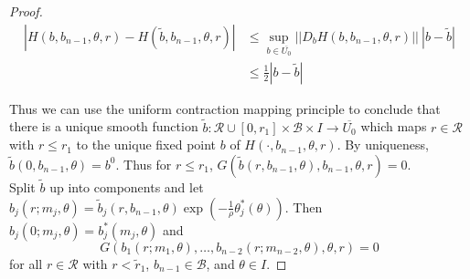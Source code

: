 \documentclass[thesis.tex]{subfiles}
\begin{document}
\begin{theorem}
\begin{proof}
\begin{align*}
|H(b, b_{n-1}, \theta, r) - H(\tilde{b}, b_{n-1}, \theta, r)| 
&\leq \sup_{b\in \overline{U_0}}||D_b H(b, b_{n-1}, \theta, r)||\:|b - \tilde{b}| \\
&\leq \frac{1}{2} |b - \tilde{b}|
\end{align*} 

Thus we can use the uniform contraction mapping principle to conclude that there is a unique smooth function $\tilde{b}: \mathcal{R} \cup [0, r_1] \times \mathcal{B} \times I \rightarrow \overline{U_0}$ which maps $r \in \mathcal{R}$ with $r \leq r_1$ to the unique fixed point $b$ of $H(\cdot, b_{n-1}, \theta, r)$. By uniqueness, $\tilde{b}(0, b_{n-1}, \theta) = b^0$. Thus for $r \leq r_1$, $G(\tilde{b}(r, b_{n-1}, \theta), b_{n-1}, \theta, r) = 0$. \\

Split $\tilde{b}$ up into components and let $b_j(r; m_j, \theta) = \tilde{b}_j(r, b_{n-1}, \theta) \exp( -\frac{1}{\rho} \theta_j^*(\theta) )$. Then $b_j(0; m_j, \theta) = b_j^*(m_j, \theta)$ and 
\[
G(b_1(r; m_1, \theta), \dots, b_{n-2}(r; m_{n-2}, \theta), \theta, r ) = 0
\]
for all $r \in \mathcal{R}$ with $r < \tilde{r}_1$, $b_{n-1} \in \mathcal{B}$, and $\theta \in I$.

\end{proof}
\end{theorem}



\end{document}
